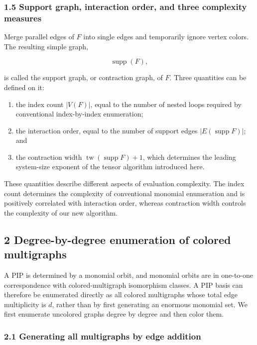 \subsubsection{1.5 Support graph, interaction order, and three complexity measures}\label{sec:support-graph}

Merge parallel edges of \(F\) into single edges and temporarily ignore vertex colors. The resulting simple graph,

\[
\operatorname{supp}(F),
\]

is called the support graph, or contraction graph, of \(F\). Three quantities can be defined on it:

\begin{enumerate}
\def\labelenumi{\arabic{enumi}.}
\tightlist
\item the index count \(|V(F)|\), equal to the number of nested loops required by conventional index-by-index enumeration;
\item the interaction order, equal to the number of support edges \(|E(\operatorname{supp}F)|\); and
\item the contraction width \(\operatorname{tw}(\operatorname{supp}F)+1\), which determines the leading system-size exponent of the tensor algorithm introduced here.
\end{enumerate}

These quantities describe different aspects of evaluation complexity. The index count determines the complexity of conventional monomial enumeration and is positively correlated with interaction order, whereas contraction width controls the complexity of our new algorithm.

\subsection{2 Degree-by-degree enumeration of colored multigraphs}\label{sec:cmg-enumeration}

A PIP is determined by a monomial orbit, and monomial orbits are in one-to-one correspondence with colored-multigraph isomorphism classes. A PIP basis can therefore be enumerated directly as all colored multigraphs whose total edge multiplicity is \(d\), rather than by first generating an enormous monomial set. We first enumerate uncolored graphs degree by degree and then color them.

\subsubsection{2.1 Generating all multigraphs by edge addition}\label{sec:edge-addition}

